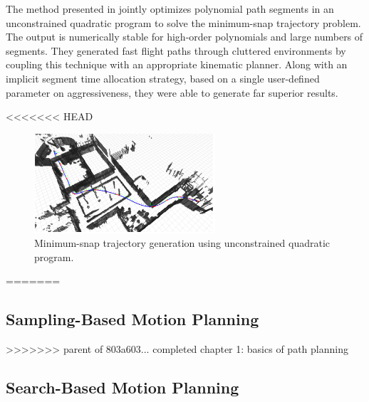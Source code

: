 The method presented in  \cite{richter2016polynomial} jointly optimizes polynomial path segments in an unconstrained quadratic program to solve the minimum-snap trajectory problem. The output is numerically stable for high-order polynomials and large numbers of segments. They generated fast flight paths through cluttered environments by coupling this technique with an appropriate kinematic planner. Along with an implicit segment time allocation strategy, based on a single user-defined parameter on aggressiveness, they were able to generate far superior results.

<<<<<<< HEAD
\begin{figure}[h!]
\centering
\includegraphics[width=0.6\textwidth]{./images/bry_poly.png}
\caption{Minimum-snap trajectory generation using unconstrained quadratic program. \cite{richter2016polynomial}}
\label{fig:bry_poly}
\end{figure}

=======

\subsection{Sampling-Based Motion Planning}
>>>>>>> parent of 803a603... completed chapter 1: basics of path planning

\subsection{Search-Based Motion Planning}

